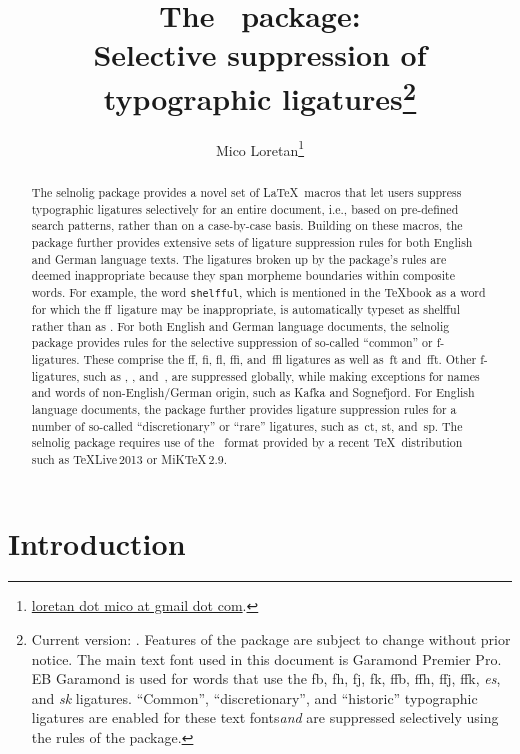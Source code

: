 \documentclass[11pt]{article}
\title{The \selnoligpackagename\ package: \\
Selective suppression of typographic ligatures\thanks{ 
Current version: \selnoligpackageversion. Features of the \pkg{selnolig} package are subject to change without prior notice. 
\newline\hspace*{\parindent}
The main text font used in this document is Garamond Premier Pro. {\ebg EB Garamond} is used for words that use the {\ebg fb, fh, fj, fk, ffb, ffh, ffj, ffk, \emph{es}, and \emph{sk}} ligatures. \enquote{Common}, \enquote{discretionary}, and \enquote{historic} typographic ligatures are enabled for these text fonts\textemdash \emph{and} are suppressed selectively using the rules of the \pkg{selnolig} package.} }
\author{Mico Loretan\thanks{
\href{mailto:loretan.mico@gmail.com}{loretan dot mico at gmail dot com}.}}
\date{\selnoligpackagedate}
\newcommand{\pkg}[1]{\textsf{#1}}
\newcommand{\opt}[1]{\texttt{#1}}
\begin{document}
\VerbatimFootnotes
{}

\selnoligoff
\maketitle
\selnoligon

\begin{abstract}

The \pkg{selnolig} package provides a novel set of \LaTeX\ macros that let users suppress typographic ligatures selectively for an entire document, i.e., based on pre-defined search patterns, rather than on a case-by-case basis. Building on these macros, the package further provides extensive sets of ligature suppression rules for both English and German language texts. The ligatures broken up by the package's rules are deemed inappropriate because they span morpheme boundaries within composite words. For example, the word \opt{shelfful}, which is mentioned in the \TeX book as a word for which the ff~ligature may be inappropriate, is automatically typeset as shelfful rather than as .
\newline\hspace*{\parindent}
For both English and German language documents, the \pkg{selnolig} package provides rules for the selective suppression of so-called \enquote{common} or f-ligatures. These comprise the ff, fi, fl, ffi, and~ffl ligatures as well as~ft and~fft. Other f-ligatures, such as {\ebg{}}, {\ebg{}}, {\ebg{}} and~{\ebg{}}, are suppressed globally, while making exceptions for names and words of non-English/German origin, such as {\ebg Kafka} and {\ebg Sognefjord}.
\newline\hspace*{\parindent}
For English language documents, the package further provides ligature suppression rules for a number of so-called \enquote{discretionary} or \enquote{rare} ligatures, such as~ct, st, and~sp.
\newline\hspace*{\parindent}
The \pkg{selnolig} package requires use of the \LuaLaTeX\ format provided by a recent \TeX\ distribution such as \TeX Live\,2013 or MiK\TeX\,2.9.
\end{abstract}

\tableofcontents

\clearpage
{}


\section{Introduction}
\end{document}

